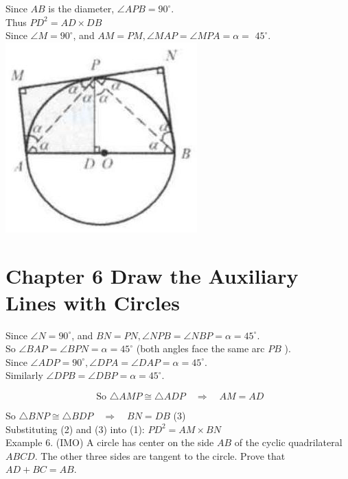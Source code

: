 \documentclass[10pt]{article}
\begin{document}
Since \(A B\) is the diameter, \(\angle A P B=90^{\circ}\).\\
Thus \(P D^{2}=A D \times D B\)\\
Since \(\angle M=90^{\circ}\), and \(A M=P M, \angle M A P=\angle M P A=\alpha=\) \(45^{\circ}\).\\
\includegraphics[max width=\textwidth, center]{2025_04_17_97bc1f7e44d93c271a88g-148}

\section*{Chapter 6 Draw the Auxiliary Lines with Circles}
Since \(\angle N=90^{\circ}\), and \(B N=P N, \angle N P B=\angle N B P=\alpha=45^{\circ}\).\\
So \(\angle B A P=\angle B P N=\alpha=45^{\circ}\) (both angles face the same arc \(P B\) ).\\
Since \(\angle A D P=90^{\circ}, \angle D P A=\angle D A P=\alpha=45^{\circ}\).\\
Similarly \(\angle D P B=\angle D B P=\alpha=45^{\circ}\).

\[
\text { So } \triangle A M P \cong \triangle A D P \quad \Rightarrow \quad A M=A D
\]

So \(\triangle B N P \cong \triangle B D P \quad \Rightarrow \quad B N=D B\) (3)\\
Substituting (2) and (3) into (1): \(P D^{2}=A M \times B N\)\\
Example 6. (IMO) A circle has center on the side \(A B\) of the cyclic quadrilateral \(A B C D\). The other three sides are tangent to the circle. Prove that \(A D+B C=A B\).
\end{document}
